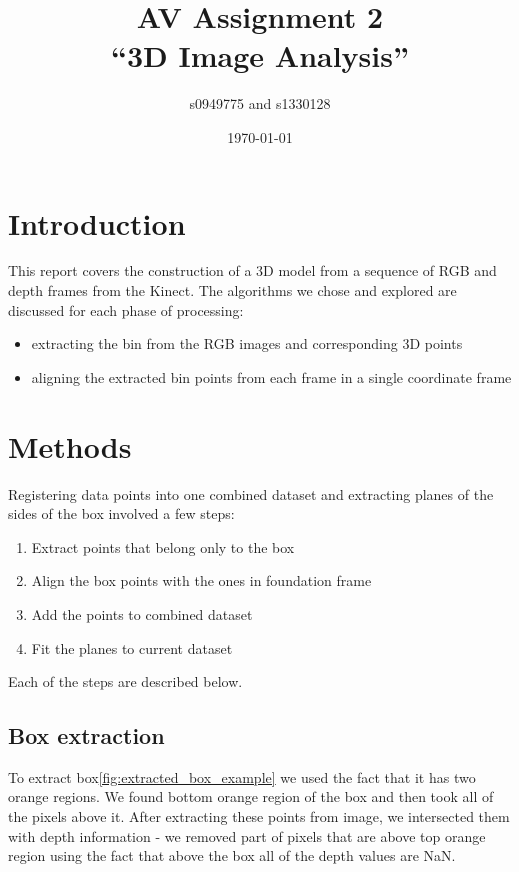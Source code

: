 \documentclass{article}
\begin{document}
\title{AV Assignment 2\\``3D Image Analysis''}
\author{s0949775 and s1330128}
\date{\today}
\maketitle


\section{Introduction}
This report covers the construction of a 3D model from a 
sequence of RGB and depth frames from the Kinect. 
The algorithms we chose and explored are discussed for
each phase of processing: 
\begin{itemize}
\item extracting the bin from the RGB images and corresponding 3D points
\item  aligning the extracted bin points from each frame in a single coordinate frame
\end{itemize}

\section{Methods}
Registering data points into one combined dataset and 
extracting planes of the sides of the box involved a few 
steps:

\begin{enumerate}
  \item Extract points that belong only to the box
  \item Align the box points with the ones in foundation frame
  \item Add the points to combined dataset
  \item Fit the planes to current dataset
\end{enumerate}

Each of the steps are described below.

\subsection{Box extraction}
To extract box\ref{fig:extracted_box_example} we used the fact that it has two orange regions.
We found bottom orange region of the box and then took all of the
pixels above it. After extracting these points from image, we 
intersected them with depth information - we removed part of
pixels that are above top orange region using the fact that above
the box all of the depth values are NaN.
\end{document}
